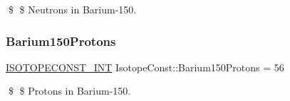 \$ \$ Neutrons in Barium-\/150. \mbox{\label{group___isotope_const-_barium-_ba150_ga5471e614a1887ad8b5c49298d8f9e420}} 
\subsubsection{\texorpdfstring{Barium150\+Protons}{Barium150Protons}}
{\footnotesize\ttfamily \mbox{\hyperlink{group___isotope_const-_macros_ga5f18360b3e99483a35c32d789e62621c}{I\+S\+O\+T\+O\+P\+E\+C\+O\+N\+S\+T\+\_\+\+I\+NT}} Isotope\+Const\+::\+Barium150\+Protons = 56}

\$ \$ Protons in Barium-\/150. 